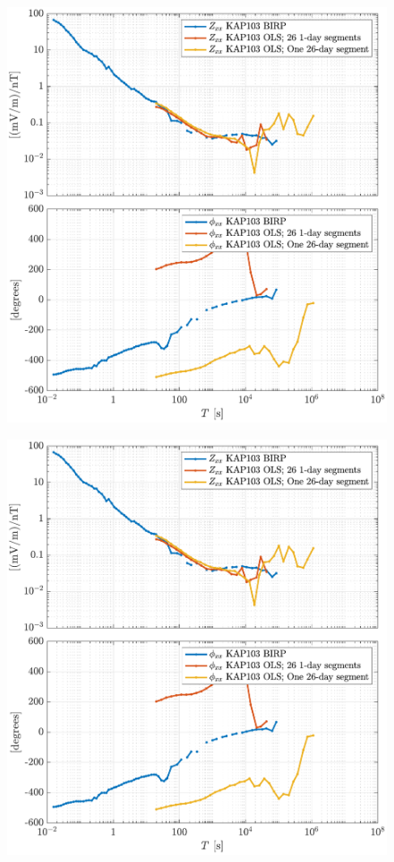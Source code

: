 \documentclass{article}
\begin{document}
\clearpage

\begin{figure}[h!]
\centering
\includegraphics[width=\textwidth]{figures/KAP103_Middelpos/transferfnZ_compare-Z_xx_Magnitude_Phase.pdf}
\caption{}
\label{fig:universe}
\end{figure}

\begin{figure}[h!]
\centering
\includegraphics[width=\textwidth]{figures/KAP103_Middelpos/transferfnZ_compare-Z_xx_Magnitude_Phase.pdf}
\caption{}
\label{fig:universe}
\end{figure}
\end{document}
